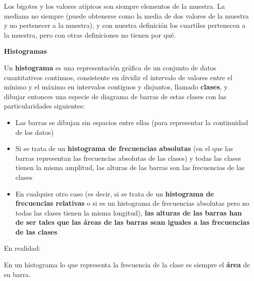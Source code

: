 \documentclass[
  spanish,
  letterpaper,
  DIV=11,
  numbers=noendperiod]{scrreprt}
\begin{document}
\begin{tcolorbox}[enhanced jigsaw, arc=.35mm, bottomrule=.15mm, bottomtitle=1mm, breakable, colback=white, colbacktitle=quarto-callout-note-color!10!white, colframe=quarto-callout-note-color-frame, coltitle=black, left=2mm, leftrule=.75mm, opacityback=0, opacitybacktitle=0.6, rightrule=.15mm, title=\textcolor{quarto-callout-note-color}{\faInfo}\hspace{0.5em}{Nota}, titlerule=0mm, toprule=.15mm, toptitle=1mm]

Los bigotes y los valores atípicos son siempre elementos de la muestra.
La mediana no siempre (puede obtenerse como la media de dos valores de
la muestra y no pertenecer a la muestra), y con nuestra definición los
cuartiles pertenecen a la muestra, pero con otras definiciones no tienen
por qué.

\end{tcolorbox}

\textbf{Histogramas}

Un \textbf{histograma} es una representación gráfica de un conjunto de
datos cuantitativos continuos, consistente en dividir el intervalo de
valores entre el mínimo y el máximo en intervalos contiguos y disjuntos,
llamado \textbf{clases}, y dibujar entonces una especie de diagrama de
barras de estas clases con las particularidades siguientes:

\begin{itemize}
\item
  Las barras se dibujan sin espacios entre ellas (para representar la
  continuidad de los datos)
\item
  Si se trata de un \textbf{histograma de frecuencias absolutas} (en el
  que las barras representan las frecuencias absolutas de las clases) y
  todas las clases tienen la misma amplitud, las alturas de las barras
  son las frecuencias de las clases
\item
  En cualquier otro caso (es decir, si se trata de un \textbf{histograma
  de frecuencias relativas} o si es un histograma de frecuencias
  absolutas pero no todas las clases tienen la misma longitud),
  \textbf{las alturas de las barras han de ser tales que las áreas de
  las barras sean iguales a las frecuencias de las clases}
\end{itemize}

En realidad:

\begin{tcolorbox}[enhanced jigsaw, arc=.35mm, bottomrule=.15mm, bottomtitle=1mm, breakable, colback=white, colbacktitle=quarto-callout-important-color!10!white, colframe=quarto-callout-important-color-frame, coltitle=black, left=2mm, leftrule=.75mm, opacityback=0, opacitybacktitle=0.6, rightrule=.15mm, title=\textcolor{quarto-callout-important-color}{\faExclamation}\hspace{0.5em}{Importante}, titlerule=0mm, toprule=.15mm, toptitle=1mm]

En un histograma lo que representa la frecuencia de la clase es siempre
el \textbf{área} de su barra.

\end{tcolorbox}
\end{document}

